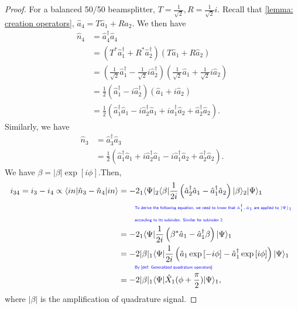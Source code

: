 \documentclass[../../note.tex]{subfiles}
\begin{document}
\begin{proof}
    For a balanced 50/50 beamsplitter, $T = \frac{1}{\sqrt{2}}, R = \frac{1}{\sqrt{2}} i$. Recall that \ref{lemma: creation operators}, $\hat{a}_4 = T \hat{a}_1 + R \hat{a}_2$. We then have
    \begin{align}
        \hat{n}_4
        &= \hat{a}_4^\dagger \hat{a}_4 \\
        &= (T^\ast \hat{a}_1^\dagger + R^\ast \hat{a}_2^\dagger)(T \hat{a}_1 + R \hat{a}_2)\\
        &= (\frac{1}{\sqrt{2}} \hat{a}_1^\dagger - \frac{1}{\sqrt{2}} i \hat{a}_2^\dagger)(\frac{1}{\sqrt{2}} \hat{a}_1 + \frac{1}{\sqrt{2}} i \hat{a}_2) \\
        &= \frac{1}{2} (\hat{a}_1^\dagger - i \hat{a}_2^\dagger)(\hat{a}_1 + i \hat{a}_2) \\
        &= \frac{1}{2}(\hat{a}_1^\dagger \hat{a}_1 - i \hat{a}_2^\dagger \hat{a}_1 + i \hat{a}_1^\dagger \hat{a}_2 + \hat{a}_2^\dagger \hat{a}_2).
    \end{align}
    Similarly, we have
    \begin{align}
        \hat{n}_3 
        &= \hat{a}_3^\dagger \hat{a}_3 \\
        &= \frac{1}{2}(\hat{a}_1^\dagger \hat{a}_1 + i \hat{a}_2^\dagger \hat{a}_1 - i \hat{a}_1^\dagger \hat{a}_2 + \hat{a}_2^\dagger \hat{a}_2).
    \end{align}
    We have $\beta = \vert \beta \vert \exp\left[i \phi\right]$.Then,
    \begin{align}
        i_{34} = i_3 -i_4 \propto \langle in \vert \hat{n}_3 - \hat{n}_4 \vert in \rangle 
        &= -2 _1\langle \Psi \vert _2\langle \beta \vert \frac{1}{2 i} \left(\hat{a}_2^\dagger \hat{a}_1 - \hat{a}_1^\dagger \hat{a}_2\right) \vert \beta \rangle_2 \vert \Psi \rangle_1 \\
        &\qquad\text{\color{blue}{\tiny\sffamily To derive the following equation, we need to know that $\hat{a}_1^\dagger, \hat{a}_1$ are applied to $\vert \Psi \rangle_1$ }} \nonumber \\
        &\qquad\text{\color{blue}{\tiny\sffamily according to its subindex. Similar for subindex 2}} \nonumber \\
        &= -2 _1 \langle \Psi \vert \frac{1}{2 i} \left(\beta^\ast \hat{a}_1 - \hat{a}_1^\dagger \beta \right) \vert \Psi \rangle_1 \\
        &=  -2 \vert \beta \vert _1 \langle \Psi \vert \frac{1}{2 i} \left(\hat{a}_1 \exp\left[-i \phi \right] - \hat{a}_1^\dagger \exp\left[i \phi\right] \right) \vert \Psi \rangle_1 \\
        &\qquad\text{\color{blue}{\tiny\sffamily By \ref{def: Generalized  quadrature operators}}} \nonumber \\
        &= -2 \vert \beta \vert _1\langle \Psi \vert \hat{X}_1(\phi + \frac{\pi}{2}) \vert \Psi \rangle_1, 
    \end{align}
    where $\vert \beta \vert$ is the amplification of quadrature signal.


\end{proof}
\end{document}
